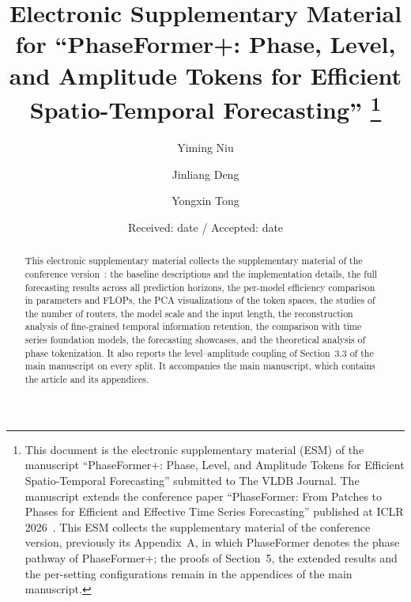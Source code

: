 \documentclass[twocolumn,natbib]{svjour3}
\newcommand{\blue}[1]{#1}
\begin{document}
\title{Electronic Supplementary Material for ``PhaseFormer+: Phase, Level, and Amplitude Tokens for Efficient Spatio-Temporal Forecasting''%
\thanks{This document is the electronic supplementary material (ESM) of the manuscript ``PhaseFormer+: Phase, Level, and Amplitude Tokens for Efficient Spatio-Temporal Forecasting'' submitted to The VLDB Journal. The manuscript extends the conference paper ``PhaseFormer: From Patches to Phases for Efficient and Effective Time Series Forecasting'' published at ICLR 2026~\citep{niu2026phaseformer}. This ESM collects the supplementary material of the conference version, previously its Appendix~A, in which PhaseFormer denotes the phase pathway of PhaseFormer+; the proofs of Section~5, the extended results and the per-setting configurations remain in the appendices of the main manuscript.}}

\author{Yiming Niu \and Jinliang Deng \and Yongxin Tong}



\date{Received: date / Accepted: date}

\maketitle

\begin{abstract}
This electronic supplementary material collects the supplementary material of the conference version~\citep{niu2026phaseformer}: the baseline descriptions and the implementation details, the full forecasting results across all prediction horizons, the per-model efficiency comparison in parameters and FLOPs, the PCA visualizations of the token spaces, the studies of the number of routers, the model scale and the input length, the reconstruction analysis of fine-grained temporal information retention, the comparison with time series foundation models, the forecasting showcases, and the theoretical analysis of phase tokenization. \blue{It also reports the level--amplitude coupling of Section~3.3 of the main manuscript on every split.} It accompanies the main manuscript, which contains the article and its appendices.
\end{abstract}
\end{document}
